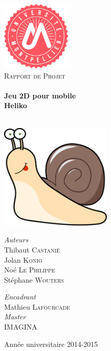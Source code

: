 \begin{titlepage}
\begin{center}

\includegraphics[width=0.25\textwidth]{./img/logoUM}~\\[1cm]

\textsc{\LARGE Rapport de Projet}\\[0.5cm]

\HRule \\[0.4cm]

{\huge \bfseries Jeu 2D pour mobile\\
Heliko \\[0.4cm] }

\HRule \\[1.5cm]


\includegraphics[width=0.4\textwidth]{./img/logo}~\\[1.5cm]

\begin{minipage}{0.4\textwidth}
\begin{flushleft} \large
\emph{Auteurs}\\
Thibaut \textsc{Castanié}\\
Jolan \textsc{Konig}\\
Noé \textsc{Le Philippe}\\
Stéphane \textsc{Wouters}
\end{flushleft}
\end{minipage}
\begin{minipage}{0.4\textwidth}
\begin{flushright} \large
\emph{Encadrant} \\
Mathieu \textsc{Lafourcade}\\
\emph{Master} \\
\textsc{IMAGINA}
\end{flushright}
\end{minipage}

\vfill

{\large Année universitaire 2014-2015}

\end{center}
\end{titlepage}
